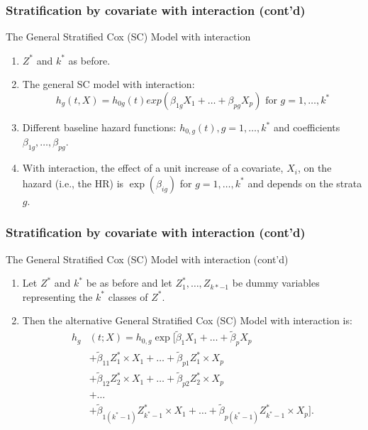 \documentclass{beamer}
\theoremstyle{definition}
\begin{document}
\begin{frame}
\frametitle{Stratification by covariate with interaction (cont'd)}
\begin{block}{The General Stratified Cox (SC) Model with interaction}
\begin{enumerate}
\item $Z^*$ and $k^*$ as before.
\item The general SC model with interaction:
\begin{equation} \label{genSCint1} 
h_g(t,X) = h_{0g}(t)exp(\beta_{1g} X_1 + \ldots + \beta_{pg} X_p) \text{ for }  g=1,\ldots,k^*
\end{equation} 
\item Different baseline hazard functions: $h_{0,g}(t), g=1,\ldots,k^*$ and coefficients $\beta_{1g}, \ldots, \beta_{pg}$.
\item With interaction, the effect of a unit increase of a covariate, $X_i$, on the hazard (i.e., the HR) is $\exp(\beta_{ig})$ for $g=1,\ldots,k^*$ and depends on the strata $g$.
\end{enumerate}
\end{block}
\end{frame}

\begin{frame}
\frametitle{Stratification by covariate with interaction (cont'd)}
\begin{block}{The General Stratified Cox (SC) Model with interaction (cont'd)}
\begin{enumerate}
\item Let $Z^*$ and $k^*$ be as before and let $Z_1^*,\ldots,Z_{k*-1}$ be dummy variables representing the $k^*$ classes of $Z^*$. 
\item Then the alternative General Stratified Cox (SC) Model with interaction is:
\begin{equation} \label{genSCint2} 
\begin{aligned} 
h_g&(t;X)= h_{0,g}\exp[\tilde{\beta}_1X_1 + \ldots + \tilde{\beta}_p X_p \\
&+\tilde{\beta}_{11}Z_1^*\times X_1 + \ldots + \tilde{\beta}_{p1}Z_1^*\times X_p \\
&+\tilde{\beta}_{12}Z_2^*\times X_1 + \ldots + \tilde{\beta}_{p2}Z_2^*\times X_p \\
&+\ldots \\
&+\tilde{\beta}_{1(k^*-1)}Z_{k^*-1}^*\times X_1 + \ldots + \tilde{\beta}_{p(k^*-1)}Z_{k^*-1}^*\times X_p]. \\
\end{aligned} 
\end{equation} 
\end{enumerate}
\end{block}
\end{frame} 
\end{document}
